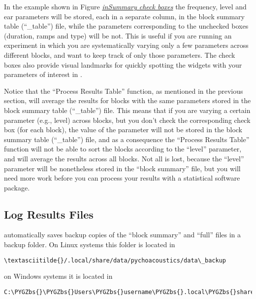 \documentclass[a4paper,12pt,english]{sphinxmanual}
\def\PYGZbs{\char`\\}
\begin{document}
In the example shown in Figure {\hyperref[engine:fig-insummarycheckboxes]{\emph{inSummary check boxes}}} the frequency,
level and ear parameters will be stored, each in a separate column, in
the block summary table (“\_table”) file, while the parameters
corresponding to the unchecked boxes (duration, ramps and type) will be
not. This is useful if you are running an experiment in which you are
systematically varying only a few parameters across different blocks,
and want to keep track of only those parameters. The  check
boxes also provide visual landmarks for quickly spotting the widgets
with your parameters of interest in .

Notice that the “Process Results Table” function, as mentioned in the
previous section, will average the results for blocks with the same
parameters stored in the block summary table (“\_table”) file. This
means that if you are varying a certain parameter (e.g., level) across
blocks, but you don’t check the corresponding  check box
(for each block), the value of the parameter will not be stored in the
block summary table (“\_table”) file, and as a consequence the “Process
Results Table” function will not be able to sort the blocks according to
the “level” parameter, and will average the results across all blocks.
Not all is lost, because the “level” parameter will be nonetheless
stored in the “block summary” file, but you will need more work before
you can process your results with a statistical software package.


\subsection{Log Results Files}
\label{engine:log-results-files}
 automatically saves backup copies of the “block
summary” and “full” files in a backup folder. On Linux systems this
folder is located in

\begin{Verbatim}[commandchars=\\\{\}]
\textasciitilde{}/.local/share/data/pychoacoustics/data\_backup
\end{Verbatim}

on Windows systems it is located in

\begin{Verbatim}[commandchars=\\\{\}]
C:\PYGZbs{}\PYGZbs{}Users\PYGZbs{}username\PYGZbs{}.local\PYGZbs{}share\PYGZbs{}data\PYGZbs{}pychoacoustics\PYGZbs{}data\_backup
\end{Verbatim}
\end{document}
